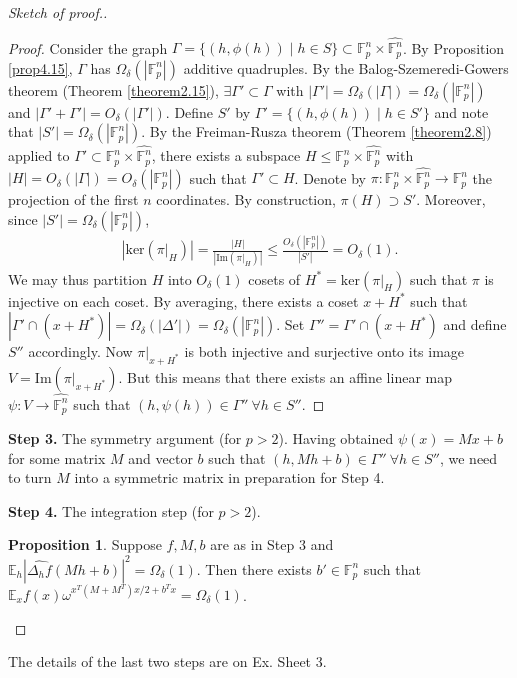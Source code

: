 \documentclass{article}
\theoremstyle{definition}
\newtheorem{prop}[theorem]{Proposition}
\begin{document}
\begin{proof}[Sketch of proof.]
\begin{proof}
        Consider the graph $\Gamma = \{(h,\phi(h)) \mid h \in S\} \subset \mathbb{F}_p^n \times \widehat{\mathbb{F}_p^n}$. By Proposition \ref{prop4.15}, $\Gamma$ has $\Omega_\delta(\left|\mathbb{F}_p^n\right|)$ additive quadruples. By the Balog-Szemeredi-Gowers theorem (Theorem \ref{theorem2.15}), $\exists \Gamma' \subset \Gamma$ with $\left|\Gamma'\right|=\Omega_\delta(\left|\Gamma\right|) = \Omega_\delta(\left|\mathbb{F}_p^n\right|)$ and $\left|\Gamma'+\Gamma'\right| = O_{\delta}(\left|\Gamma'\right|)$. Define $S'$ by $\Gamma' = \{(h,\phi(h)) \mid h \in S'\}$ and note that $\left|S'\right| = \Omega_\delta(\left|\mathbb{F}_p^n\right|)$. By the Freiman-Rusza theorem (Theorem \ref{theorem2.8}) applied to $\Gamma' \subset \mathbb{F}_p^n \times \widehat{\mathbb{F}_p^n}$, there exists a subspace $H \le \mathbb{F}_p^n \times \widehat{\mathbb{F}_p^n}$ with $\left|H\right| = O_\delta(\left|\Gamma\right|)=O_\delta(\left|\mathbb{F}_p^n\right|)$ such that $\Gamma' \subset H$. Denote by $\pi : \mathbb{F}_p^n \times \widehat{\mathbb{F}_p^n} \to \mathbb{F}_p^n$ the projection of the first $n$ coordinates. By construction, $\pi(H) \supset S'$. Moreover, since $\left|S'\right|=\Omega_\delta(\left|\mathbb{F}_p^n\right|)$, 
        \begin{align*}
            \left|\text{ker}(\pi|_H)\right| = \frac{\left|H\right|}{\left|\text{Im}(\pi|_H)\right|} \le \frac{O_\delta(\left|\mathbb{F}_p^n\right|)}{\left|S'\right|}=O_{\delta}(1).
        \end{align*}
        We may thus partition $H$ into $O_{\delta}(1)$ cosets of $H^* = \text{ker}(\pi|_H)$ such that $\pi$ is injective on each coset. By averaging, there exists a coset $x+H^*$ such that $\left|\Gamma' \cap (x +H^*)\right|=\Omega_\delta(\left|\Delta'\right|) = \Omega_\delta(\left|\mathbb{F}_p^n\right|)$. Set $\Gamma'' = \Gamma' \cap (x+H^*)$ and define $S''$ accordingly. Now $\pi|_{x+H^*}$ is both injective and surjective onto its image $V = \text{Im}(\pi|_{x+H^*})$. But this means that there exists an affine linear map $\psi : V \to \widehat{\mathbb{F}_p^n}$ such that $(h,\psi(h)) \in \Gamma'' ~\forall h \in S''$.
    \end{proof}
    \textbf{Step 3.} The symmetry argument (for $p>2$). Having obtained $\psi(x) = Mx+b$ for some matrix $M$ and vector $b$ such that $(h,Mh+b) \in \Gamma'' ~\forall h \in S''$, we need to turn $M$ into a symmetric matrix in preparation for Step 4.
    \vspace{1mm}
     
    \textbf{Step 4.} The integration step (for $p>2$).
    \begin{prop}\label{4.18}
        Suppose $f,M,b$ are as in Step 3 and $\mathbb{E}_h\left|\widehat{\Delta_hf}(Mh+b)\right|^2 = \Omega_\delta(1)$. Then there exists $b' \in \mathbb{F}_p^n$ such that $\mathbb{E}_x f(x)\omega^{x^T(M+M^T)x/2 + b^Tx} = \Omega_{\delta}(1)$.
    \end{prop}
\end{proof}
The details of the last two steps are on Ex. Sheet 3.
\end{document}
